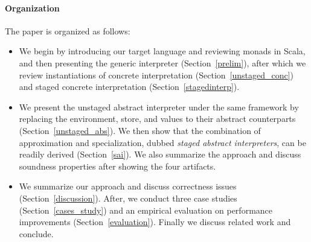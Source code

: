 \paragraph{Organization} The paper is organized as follows:
\begin{itemize}[leftmargin=2em]
  \item We begin by introducing our target language and reviewing
    monads in Scala, and then presenting the generic interpreter
    (Section~\ref{prelim}), after which we review instantiations
    of concrete interpretation (Section~\ref{unstaged_conc}) and
    staged concrete interpretation (Section~\ref{stagedinterp}).
  \item We present the unstaged abstract interpreter under the same
    framework by replacing the environment, store, and values to their
    abstract counterparts (Section~\ref{unstaged_abs}). We then
    show that the combination of approximation and specialization, dubbed
    \textit{staged abstract interpreters}, can be readily derived
    (Section~\ref{sai}). We also summarize the approach and discuss
    soundness properties after showing the four artifacts.
  \item We summarize our approach and discuss correctness issues (Section~\ref{discussion}).
    After, we conduct three case studies (Section~\ref{cases_study}) and
    an empirical evaluation on performance improvements (Section~\ref{evaluation}).
    Finally we discuss related work and conclude.
\end{itemize}

\iffalse
On the other side, static analysis is a trade-off between performance and
precision: higher precision usually leads to longer running time.

4. Existing method to improve the performance is adhoc, engineering heavy, require to rewrite the optimized version, therefore harder to reason about the correctness
6. program analyzers are also meta-programs, they manipulate other programs as data objects
\fi
